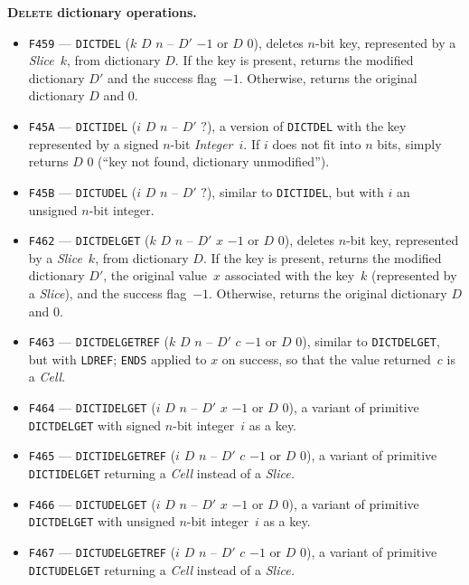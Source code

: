 \documentclass[12pt,oneside]{article}
\def\makepoint#1{\medbreak\noindent{\bf #1.\ }}
\def\nxsubpoint{\refstepcounter{subsubsection}%
  \smallbreak\makepoint{\thesubsubsection}}
\def\emb#1{\textbf{#1.}}
\begin{document}
\nxsubpoint\label{sp:prim.dict.delete}\emb{\textsc{Delete} dictionary operations}
\begin{itemize}
\item {\tt F459} --- {\tt DICTDEL} ($k$ $D$ $n$ -- $D'$ $-1$ or $D$ $0$), deletes $n$-bit key, represented by a {\em Slice}~$k$, from dictionary $D$. If the key is present, returns the modified dictionary $D'$ and the success flag~$-1$. Otherwise, returns the original dictionary $D$ and $0$.
\item {\tt F45A} --- {\tt DICTIDEL} ($i$ $D$ $n$ -- $D'$ $?$), a version of {\tt DICTDEL} with the key represented by a signed $n$-bit {\em Integer}~$i$. If $i$ does not fit into $n$ bits, simply returns $D$ $0$ (``key not found, dictionary unmodified'').
\item {\tt F45B} --- {\tt DICTUDEL} ($i$ $D$ $n$ -- $D'$ $?$), similar to {\tt DICTIDEL}, but with $i$ an unsigned $n$-bit integer.
\item {\tt F462} --- {\tt DICTDELGET} ($k$ $D$ $n$ -- $D'$ $x$ $-1$ or $D$ $0$), deletes $n$-bit key, represented by a {\em Slice}~$k$, from dictionary $D$. If the key is present, returns the modified dictionary $D'$, the original value~$x$ associated with the key~$k$ (represented by a {\em Slice}), and the success flag~$-1$. Otherwise, returns the original dictionary $D$ and $0$.
\item {\tt F463} --- {\tt DICTDELGETREF} ($k$ $D$ $n$ -- $D'$ $c$ $-1$ or $D$ $0$), similar to {\tt DICTDELGET}, but with {\tt LDREF}; {\tt ENDS} applied to $x$ on success, so that the value returned~$c$ is a {\em Cell}.
\item {\tt F464} --- {\tt DICTIDELGET} ($i$ $D$ $n$ -- $D'$ $x$ $-1$ or $D$ $0$), a variant of primitive {\tt DICTDELGET} with signed $n$-bit integer~$i$ as a key.
\item {\tt F465} --- {\tt DICTIDELGETREF} ($i$ $D$ $n$ -- $D'$ $c$ $-1$ or $D$ $0$), a variant of primitive {\tt DICTIDELGET} returning a {\em Cell\/} instead of a {\em Slice.}
\item {\tt F466} --- {\tt DICTUDELGET} ($i$ $D$ $n$ -- $D'$ $x$ $-1$ or $D$ $0$), a variant of primitive {\tt DICTDELGET} with unsigned $n$-bit integer~$i$ as a key.
\item {\tt F467} --- {\tt DICTUDELGETREF} ($i$ $D$ $n$ -- $D'$ $c$ $-1$ or $D$ $0$), a variant of primitive {\tt DICTUDELGET} returning a {\em Cell\/} instead of a {\em Slice.}
\end{itemize}
\end{document}
